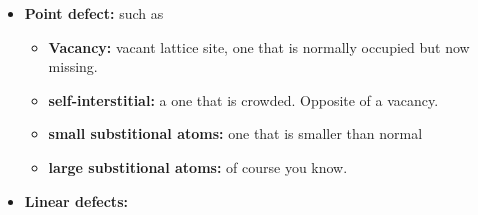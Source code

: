 \documentclass[13]{article}
\begin{document}
\begin{itemize}

	\item \textbf{Point defect:}  such as 
	\begin{itemize}
	
		\item\textbf{ Vacancy:}  vacant lattice site, one that is normally occupied but now missing.
		\item \textbf{self-interstitial:}  a one that is crowded. Opposite of a vacancy.
		\item \textbf{small substitional atoms:}  one that is smaller than normal
		\item \textbf{large substitional atoms:}  of course you know.
	\end{itemize}
\item \textbf{Linear defects:}  \begin{itemize}


\end{itemize}
\end{itemize}
\end{document}
